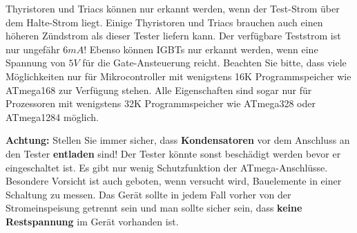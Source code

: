 Thyristoren und Triacs können nur erkannt werden, wenn der Test-Strom über dem Halte-Strom liegt.
Einige Thyristoren und Triacs brauchen auch einen höheren Zündstrom als dieser Tester liefern kann.
Der verfügbare Teststrom ist nur ungefähr \(6mA\)!
Ebenso können IGBTs nur erkannt werden, wenn eine Spannung von \(5V\) für die Gate-Ansteuerung reicht.
Beachten Sie bitte, dass viele Möglichkeiten nur für Mikrocontroller mit wenigstens 16K Programmspeicher wie ATmega168 zur Verfügung stehen. 
Alle Eigenschaften sind sogar nur für Prozessoren mit wenigstens 32K Programmspeicher wie ATmega328 oder ATmega1284 möglich.

\vspace{1cm}
\textbf{{\Large Achtung:}} Stellen Sie immer sicher, dass {\bf Kondensatoren} vor dem Anschluss an den Tester {\bf entladen} sind!
Der Tester könnte sonst beschädigt werden bevor er eingeschaltet ist.
Es gibt nur wenig Schutzfunktion der ATmega-Anschlüsse.
Besondere Vorsicht ist auch geboten, wenn versucht wird, Bauelemente in einer Schaltung zu messen.
Das Gerät sollte in jedem Fall vorher von der Strom\-ein\-spei\-sung getrennt sein und man sollte sicher sein,
dass {\bf keine Restspannung} im Gerät vorhanden ist.


